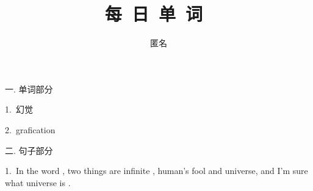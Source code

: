 \documentclass[a4paper, 12pt]{article}
\begin{document}
    \noindent

    \title{ 每\ 日\ 单\ 词\  }
    \author{ 匿名 }
    \maketitle

\begin{flushleft}
一. 单词部分
\end{flushleft}

\begin{multicols}{2}
\begin{flushleft}
1.\ 幻觉 \ \ \ \ \underline{\hspace{3cm}}
\end{flushleft}

\begin{flushleft}
2.\ grafication \ \ \ \ \underline{\hspace{3cm}}
\end{flushleft}
\end{multicols}

\begin{flushleft}
二. 句子部分
\end{flushleft}

\begin{flushleft}
1.\ In the word , two things are infinite , human's fool and universe, and I'm sure what universe is .

\underline{\hspace{16cm}}
\end{flushleft}
\end{document}
